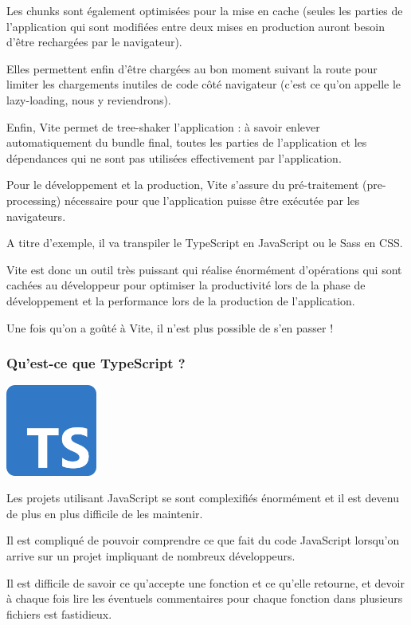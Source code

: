 \documentclass{article}
\begin{document}
Les chunks sont également optimisées pour la mise en cache (seules les parties de l'application qui sont modifiées entre deux mises en production auront besoin d'être rechargées par le navigateur).

Elles permettent enfin d'être chargées au bon moment suivant la route pour limiter les chargements inutiles de code côté navigateur (c'est ce qu'on appelle le lazy-loading, nous y reviendrons).

Enfin, Vite permet de tree-shaker l'application : à savoir enlever automatiquement du bundle final, toutes les parties de l'application et les dépendances qui ne sont pas utilisées effectivement par l'application.

Pour le développement et la production, Vite s'assure du pré-traitement (pre-processing) nécessaire pour que l'application puisse être exécutée par les navigateurs.

A titre d'exemple, il va transpiler le TypeScript en JavaScript ou le Sass en CSS.

Vite est donc un outil très puissant qui réalise énormément d'opérations qui sont cachées au développeur pour optimiser la productivité lors de la phase de développement et la performance lors de la production de l'application.

Une fois qu'on a goûté à Vite, il n'est plus possible de s'en passer !

\subsubsection{Qu'est-ce que TypeScript ?}
\begin{center}
\includegraphics[width=3cm]{images/image03.png}
\end{center}

Les projets utilisant JavaScript se sont complexifiés énormément et il est devenu de plus en plus difficile de les maintenir.

Il est compliqué de pouvoir comprendre ce que fait du code JavaScript lorsqu'on arrive sur un projet impliquant de nombreux développeurs.

Il est difficile de savoir ce qu'accepte une fonction et ce qu'elle retourne, et devoir à chaque fois lire les éventuels commentaires pour chaque fonction dans plusieurs fichiers est fastidieux.
\end{document}
